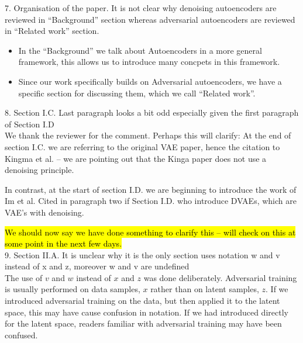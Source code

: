 \documentclass{article}
\begin{document}
{\color{blue}
7. Organisation of the paper. It is not clear why denoising autoencoders are reviewed in ``Background'' section whereas adversarial autoencoders are reviewed in ``Related work'' section.}\\

\begin{itemize}
    \item In the ``Background'' we talk about Autoencoders in a more general framework, this allows us to introduce many concpets in this framework.
    \item Since our work specifically builds on Adversarial autoencoders, we have a specific section for discussing them, which we call ``Related work''. 
\end{itemize}

{\color{blue}
8. Section I.C. Last paragraph looks a bit odd especially given the first paragraph of Section I.D}\\

We thank the reviewer for the comment.  Perhaps this will clarify: At the end of section I.C. we are referring to the original VAE paper, hence the citation to Kingma et al. -- we are pointing out that the Kinga paper does not use a denoising principle.

In contrast, at the start of section I.D. we are beginning to introduce the work of Im et al. Cited in paragraph two if Section I.D. who introduce DVAEs, which are VAE's with denoising.

\hl{We should now say we have done something to clarify this -- will check on this at some point in the next few days.}\\

{\color{blue}
9. Section II.A. It is unclear why it is the only section uses notation w and v instead of x and z, moreover w and v are undefined}\\

The use of $v$ and $w$ instead of $x$ and $z$ was done deliberately. Adversarial training is usually performed on data samples, $x$ rather than on latent samples, $z$. If we introduced adversarial training on the data, but then applied it to the latent space, this may have cause confusion in notation. If we had introduced directly for the latent space, readers familiar with adversarial training may have been confused. 
\end{document}
